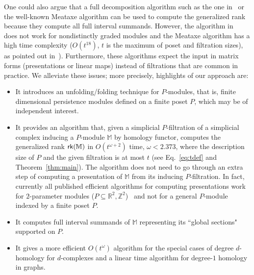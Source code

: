 \documentclass[11pt]{article}
\theoremstyle{plain}%
\newcommand{\M}{\mathbb{M}}
\newcommand{\Z}{\mathbb{Z}}
\newcommand{\rk}{{\sf{rk}}}
\begin{document}
One could also argue that a full decomposition algorithm such as the one 
in~\cite{DX22}
or the well-known Meataxe algorithm can be used to compute the
generalized rank because they compute all full interval summands. However,
the algorithm in~\cite{DX22} does not work for nondistinctly graded modules and the
Meataxe algorithm has a high time complexity ($O(t^{18})$, $t$ is the maximum of poset and filtration sizes), as pointed out in~\cite{DX22}). Furthermore, these algorithms expect the input in matrix forms (presentations or linear maps) instead of filtrations that are common in practice. We alleviate these issues; more precisely, highlights of our approach are:
\begin{itemize}
    \item It introduces an unfolding/folding technique for $P$-modules, that is,
    finite dimensional persistence modules defined on a finite poset $P$, which may be of independent
    interest. 
    \item It provides an algorithm that, given a
    simplicial $P$-filtration of a simplicial complex inducing a $P$-module $\M$ by homology functor,
    computes the generalized rank $\rk(\M)$ in $O(t^{\omega+2})$ time,
    $\omega < 2.373$, where
    the description size of $P$ and the given filtration is at most $t$ (see Eq.~\eqref{eq:tdef} and Theorem~\ref{thm:main}). The algorithm
    does not need to go through an extra step of computing a presentation
    of $\M$ from its inducing $P$-filtration. In fact, currently all published efficient algorithms for computing presentations work for $2$-parameter modules ($P\subseteq \mathbb{R}^2,\Z^2$)~\cite{KR21,LW22} and not for a general $P$-module indexed by a finite poset $P$.
    \item It computes
full interval summands of $\M$ representing its ``global sections" supported on $P$.
\item It gives a more efficient $O(t^\omega)$ algorithm for
the special cases of degree $d$-homology for $d$-complexes and a linear time
algorithm for degree-$1$ homology in graphs.
\end{itemize}

\end{document}
